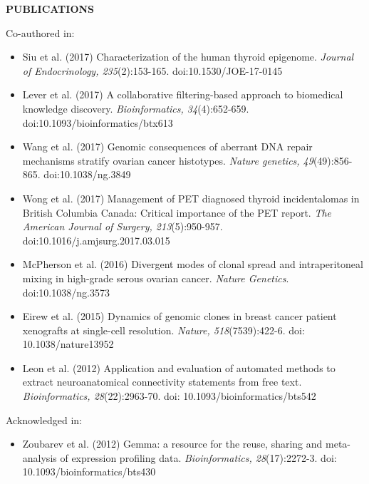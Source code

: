 \documentclass{res}
\renewcommand{\section}[1]{%
  \vspace{0.3in}%
  \centerline{\uppercase{\bf{#1}}}%
  \vspace{-6pt}}
\newenvironment{publicationlists}{%
  \begin{itemize}\leftmargin=3em \itemindent=-1em \itemsep=2pt%
  }{%
  \end{itemize}}
\begin{document}
\begin{resume}
\section{Publications}

Co-authored in:\vspace{4pt}
\begin{publicationlists}
  \item Siu et al. (2017) Characterization of the human thyroid epigenome. {\sl Journal of Endocrinology, 235}(2):153-165. doi:10.1530/JOE-17-0145
  \item Lever et al. (2017) A collaborative filtering-based approach to biomedical knowledge discovery. {\sl Bioinformatics, 34}(4):652-659. doi:10.1093/bioinformatics/btx613
  \item Wang et al. (2017) Genomic consequences of aberrant DNA repair mechanisms stratify ovarian cancer histotypes. {\sl Nature genetics, 49}(49):856-865. doi:10.1038/ng.3849
  \item Wong et al. (2017) Management of PET diagnosed thyroid incidentalomas in British Columbia Canada: Critical importance of the PET report. {\sl The American Journal of Surgery, 213}(5):950-957. doi:10.1016/j.amjsurg.2017.03.015
  \item McPherson et al. (2016) Divergent modes of clonal spread and intraperitoneal mixing in high-grade serous ovarian cancer. {\sl Nature Genetics}. doi:10.1038/ng.3573
  \item Eirew et al. (2015) Dynamics of genomic clones in breast cancer patient xenografts at single-cell resolution. {\sl Nature, 518}(7539):422-6. doi: 10.1038/nature13952
  \item Leon et al. (2012) Application and evaluation of automated methods to extract neuroanatomical connectivity statements from free text. {\sl Bioinformatics, 28}(22):2963-70. doi: 10.1093/bioinformatics/bts542
\end{publicationlists}

\pagebreak
Acknowledged in:\vspace{4pt}
\begin{publicationlists}
  \item Zoubarev et al. (2012) Gemma: a resource for the reuse, sharing and meta-analysis of expression profiling data. {\sl Bioinformatics, 28}(17):2272-3. doi: 10.1093/bioinformatics/bts430
\end{publicationlists}


\end{resume}
\end{document}
